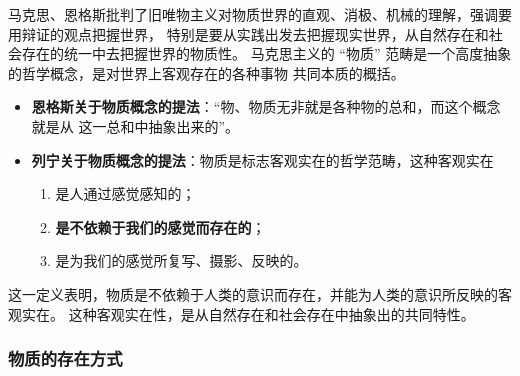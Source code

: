 \documentclass[10pt, UTF8]{book} %
\begin{document}
马克思、恩格斯批判了旧唯物主义对物质世界的直观、消极、机械的理解，强调要用辩证的观点把握世界，
特别是要从实践出发去把握现实世界，从自然存在和社会存在的统一中去把握世界的物质性。
马克思主义的 “物质” 范畴是一个高度抽象的哲学概念，是对世界上客观存在的各种事物
共同本质的概括。
\begin{itemize}[itemsep=0pt]
    \item \textbf{恩格斯关于物质概念的提法}：“物、物质无非就是各种物的总和，而这个概念就是从
    这一总和中抽象出来的”。
    \item \textbf{列宁关于物质概念的提法}：物质是标志客观实在的哲学范畴，这种客观实在
    \begin{enumerate}[label=\textup{\arabic*}${}^\circ$, itemsep=0pt]
        \item 是人通过感觉感知的；
        \item \textbf{是不依赖于我们的感觉而存在的}；
        \item 是为我们的感觉所复写、摄影、反映的。
    \end{enumerate}


\end{itemize}
这一定义表明，物质是不依赖于人类的意识而存在，并能为人类的意识所反映的客观实在。
这种客观实在性，是从自然存在和社会存在中抽象出的共同特性。

\subsubsection{物质的存在方式}
\end{document}
